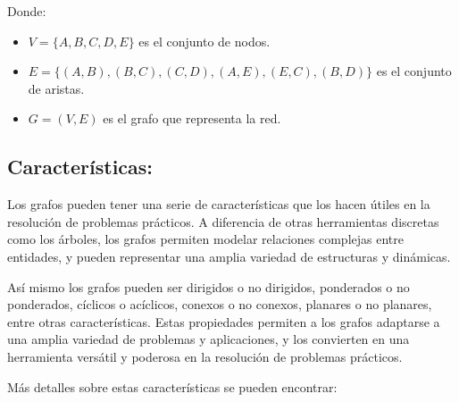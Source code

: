 \documentclass[11pt, a4paper]{article}
\begin{document}
    Donde: 

    \begin{itemize}
      \item $V = \{A, B, C, D, E\}$ es el conjunto de nodos.
      \item $E = \{(A, B), (B, C), (C, D), (A, E), (E, C), (B, D)\}$ es el conjunto de aristas.
      \item $G = (V, E)$ es el grafo que representa la red.
    \end{itemize}

\subsection{Características:}

Los grafos pueden tener una serie de características que los hacen útiles en la resolución de problemas prácticos. A diferencia de otras herramientas discretas como los árboles, los grafos permiten modelar relaciones complejas entre entidades, y pueden representar una amplia variedad de estructuras y dinámicas.

Así mismo los grafos pueden ser dirigidos o no dirigidos, ponderados o no ponderados, cíclicos o acíclicos, conexos o no conexos, planares o no planares, entre otras características. Estas propiedades permiten a los grafos adaptarse a una amplia variedad de problemas y aplicaciones, y los convierten en una herramienta versátil y poderosa en la resolución de problemas prácticos.

Más detalles sobre estas características se pueden encontrar:
\end{document}
